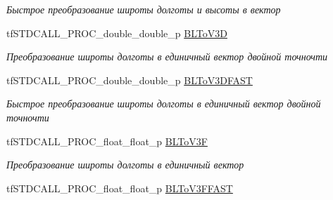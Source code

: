 \begin{DoxyCompactItemize}
\begin{DoxyCompactList}\small\item\em Быстрое преобразование широты долготы и высоты в вектор \end{DoxyCompactList}\item 
\hypertarget{structs_functions_extension_c_p_u_a37d6dc542195393b52cdb03161be2c82}{tf\-S\-T\-D\-C\-A\-L\-L\-\_\-\-P\-R\-O\-C\-\_\-double\-\_\-double\-\_\-p \hyperlink{structs_functions_extension_c_p_u_a37d6dc542195393b52cdb03161be2c82}{B\-L\-To\-V3\-D}}\label{structs_functions_extension_c_p_u_a37d6dc542195393b52cdb03161be2c82}

\begin{DoxyCompactList}\small\item\em Преобразование широты долготы в единичный вектор двойной точночти \end{DoxyCompactList}\item 
\hypertarget{structs_functions_extension_c_p_u_a04bbc8f97307417afa88ccd430606cf4}{tf\-S\-T\-D\-C\-A\-L\-L\-\_\-\-P\-R\-O\-C\-\_\-double\-\_\-double\-\_\-p \hyperlink{structs_functions_extension_c_p_u_a04bbc8f97307417afa88ccd430606cf4}{B\-L\-To\-V3\-D\-F\-A\-S\-T}}\label{structs_functions_extension_c_p_u_a04bbc8f97307417afa88ccd430606cf4}

\begin{DoxyCompactList}\small\item\em Быстрое преобразование широты долготы в единичный вектор двойной точночти \end{DoxyCompactList}\item 
\hypertarget{structs_functions_extension_c_p_u_a0d5ca4d8edb461a04c959941bf62dd0c}{tf\-S\-T\-D\-C\-A\-L\-L\-\_\-\-P\-R\-O\-C\-\_\-float\-\_\-float\-\_\-p \hyperlink{structs_functions_extension_c_p_u_a0d5ca4d8edb461a04c959941bf62dd0c}{B\-L\-To\-V3\-F}}\label{structs_functions_extension_c_p_u_a0d5ca4d8edb461a04c959941bf62dd0c}

\begin{DoxyCompactList}\small\item\em Преобразование широты долготы в единичный вектор \end{DoxyCompactList}\item 
\hypertarget{structs_functions_extension_c_p_u_a70f46e3fd91f57901f385cc7ed249207}{tf\-S\-T\-D\-C\-A\-L\-L\-\_\-\-P\-R\-O\-C\-\_\-float\-\_\-float\-\_\-p \hyperlink{structs_functions_extension_c_p_u_a70f46e3fd91f57901f385cc7ed249207}{B\-L\-To\-V3\-F\-F\-A\-S\-T}}\label{structs_functions_extension_c_p_u_a70f46e3fd91f57901f385cc7ed249207}


\end{DoxyCompactItemize}
